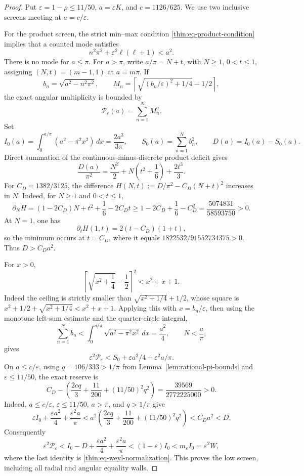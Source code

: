 \documentclass[11pt]{article}
\numberwithin{equation}{section}
\theoremstyle{definition}
\theoremstyle{remark}
\begin{document}
\begin{proof}
Put \(\varepsilon=1-\rho\leq11/50\),
\(a=\varepsilon K\), and \(c=1126/625\).  We use two inclusive screens
meeting at \(a=c/\varepsilon\).

For the product screen, the strict min--max condition
\eqref{thin:eq-product-condition} implies that a counted mode satisfies
\[
 n^2\pi^2+\varepsilon^2\ell(\ell+1)<a^2.
\]
There is no mode for \(a\leq\pi\).  For \(a>\pi\), write
\(a/\pi=N+t\), with \(N\geq1\), \(0<t\leq1\), assigning
\((N,t)=(m-1,1)\) at \(a=m\pi\).  If
\[
 b_n=\sqrt{a^2-n^2\pi^2},\qquad
 M_n=\left\lceil\sqrt{(b_n/\varepsilon)^2+1/4}-1/2\right\rceil,
\]
the exact angular multiplicity is bounded by
\[
 \mathcal P_\varepsilon(a)=\sum_{n=1}^N M_n^2.
\]
Set
\[
 I_0(a)=\int_0^{a/\pi}(a^2-\pi^2x^2)\,dx
       =\frac{2a^3}{3\pi},
 \qquad
 S_0(a)=\sum_{n=1}^N b_n^2,
 \qquad D(a)=I_0(a)-S_0(a).
\]
Direct summation of the continuous-minus-discrete product deficit gives
\begin{equation}
 \frac{D(a)}{\pi^2}=\frac{N^2}{2}
 +N\left(t^2+\frac16\right)+\frac{2t^3}{3}.
 \label{cm:eq-optical-product-deficit}
\end{equation}
For \(C_D=1382/3125\), the difference
\(H(N,t):=D/\pi^2-C_D(N+t)^2\) increases in \(N\).  Indeed, for
\(N\geq1\) and \(0<t\leq1\),
\[
 \partial_NH
 =(1-2C_D)N+t^2+\frac16-2C_Dt
 \geq1-2C_D+\frac16-C_D^2
 =\frac{5074831}{58593750}>0.
\]
At \(N=1\), one has
\[
 \partial_tH(1,t)=2(t-C_D)(1+t),
\]
so the minimum occurs at \(t=C_D\), where it equals
\(1822532/91552734375>0\).  Thus \(D>C_Da^2\).

For \(x>0\),
\[
\left\lceil\sqrt{x^2+\frac14}-\frac12\right\rceil^2
 <x^2+x+1.
\]
Indeed the ceiling is strictly smaller than
\(\sqrt{x^2+1/4}+1/2\), whose square is
\(x^2+1/2+\sqrt{x^2+1/4}<x^2+x+1\).  Applying this with
\(x=b_n/\varepsilon\), then using the monotone left-sum estimate and the
quarter-circle integral,
\[
 \sum_{n=1}^N b_n
 <\int_0^{a/\pi}\sqrt{a^2-\pi^2x^2}\,dx=\frac{a^2}{4},
 \qquad N<\frac a\pi,
\]
gives
\[
 \varepsilon^2\mathcal P_\varepsilon
 <S_0+\varepsilon a^2/4+\varepsilon^2a/\pi.
\]
On \(a\leq c/\varepsilon\), using
\(q=106/333>1/\pi\) from Lemma~\ref{lem:rational-pi-bounds} and
\(\varepsilon\leq11/50\), the exact reserve is
\begin{equation}
 C_D-\left(\frac{2cq}{3}+\frac{11}{200}
 +(11/50)^2q^2\right)
 =\frac{39569}{2772225000}>0.
 \label{cm:eq-optical-low-reserve}
\end{equation}
Indeed, \(a\leq c/\varepsilon\), \(\varepsilon\leq11/50\),
\(a>\pi\), and \(q>1/\pi\) give
\[
 \varepsilon I_0+\frac{\varepsilon a^2}{4}
 +\frac{\varepsilon^2a}{\pi}
 <a^2\left(\frac{2cq}{3}+\frac{11}{200}
 +(11/50)^2q^2\right)<C_Da^2<D.
\]
Consequently
\[
 \varepsilon^2\mathcal P_\varepsilon
 <I_0-D+\frac{\varepsilon a^2}{4}
 +\frac{\varepsilon^2a}{\pi}
 <(1-\varepsilon)I_0<m_\varepsilon I_0
 =\varepsilon^2W,
\]
where the last identity is \eqref{thin:eq-weyl-normalization}.
This proves the low screen, including all radial and angular equality walls.


\end{proof}
\end{document}
